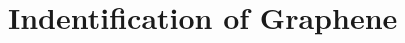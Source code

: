 \documentclass[../Matt_Gebert_Honours_Thesis.tex]{subfiles}
\begin{document}
	
\section{Indentification of Graphene}
%	
	
\end{document}
